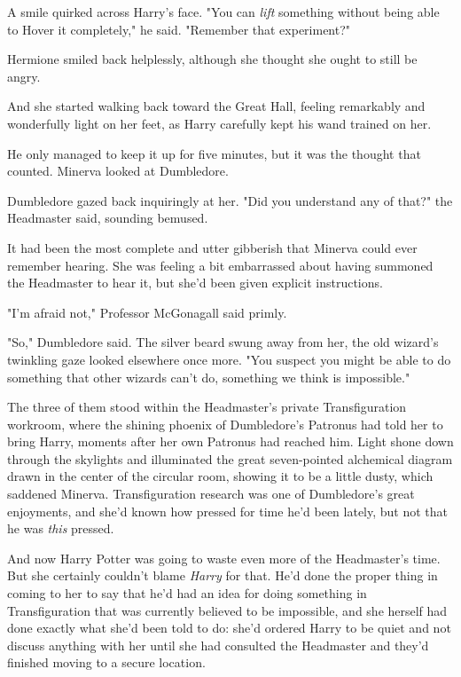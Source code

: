 A smile quirked across Harry's face. "You can \emph{lift} something without
being able to Hover it completely," he said. "Remember that experiment?"

Hermione smiled back helplessly, although she thought she ought to still be
angry.

And she started walking back toward the Great Hall, feeling remarkably and
wonderfully light on her feet, as Harry carefully kept his wand trained on her.

He only managed to keep it up for five minutes, but it was the thought that
counted.
\sbreak
Minerva looked at Dumbledore.

Dumbledore gazed back inquiringly at her. "Did you understand any of that?" the
Headmaster said, sounding bemused.

It had been the most complete and utter gibberish that Minerva could ever
remember hearing. She was feeling a bit embarrassed about having summoned the
Headmaster to hear it, but she'd been given explicit instructions.

"I'm afraid not," Professor McGonagall said primly.

"So," Dumbledore said. The silver beard swung away from her, the old wizard's
twinkling gaze looked elsewhere once more. "You suspect you might be able to do
something that other wizards can't do, something we think is impossible."

The three of them stood within the Headmaster's private Transfiguration
workroom, where the shining phoenix of Dumbledore's Patronus had told her to
bring Harry, moments after her own Patronus had reached him. Light shone down
through the skylights and illuminated the great seven-pointed alchemical
diagram drawn in the center of the circular room, showing it to be a little
dusty, which saddened Minerva. Transfiguration research was one of Dumbledore's
great enjoyments, and she'd known how pressed for time he'd been lately, but
not that he was \emph{this} pressed.

And now Harry Potter was going to waste even more of the Headmaster's time. But
she certainly couldn't blame \emph{Harry} for that. He'd done the proper thing
in coming to her to say that he'd had an idea for doing something in
Transfiguration that was currently believed to be impossible, and she herself
had done exactly what she'd been told to do: she'd ordered Harry to be quiet
and not discuss anything with her until she had consulted the Headmaster and
they'd finished moving to a secure location.

